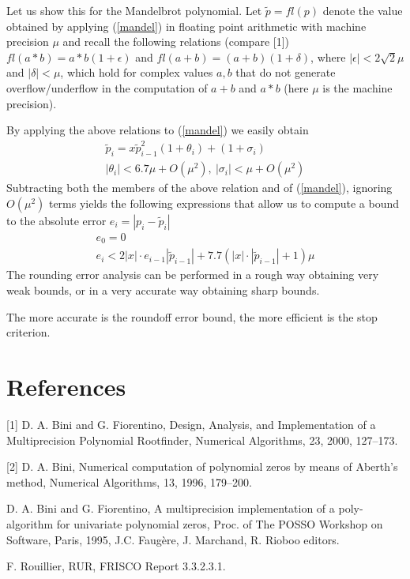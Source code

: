 \documentclass{article}
\begin{document}
Let us show this for the Mandelbrot polynomial.  Let $\widetilde
p=fl(p)$ denote the value obtained by applying (\ref{mandel}) in
floating point arithmetic with machine precision $\mu$ and recall the
following relations (compare [1]) $fl(a*b)=a*b(1+\epsilon)$ and
$fl(a+b)=(a+b)(1+\delta)$, where $|\epsilon|<2\sqrt 2\mu$ and
$|\delta|<\mu$, which hold for complex values $a,b$ that do not
generate overflow/underflow in the computation of $a+b$ and $a*b$
(here $\mu$ is the machine precision).

By applying the above relations to (\ref{mandel}) we easily obtain
\[
\begin{array}{l}
\widetilde p_{i}=x\widetilde p_{i-1}^2(1+\theta_i)+(1+\sigma_i) \\
|\theta_i|<6.7\mu +O(\mu^2),\ |\sigma_i|<\mu+O(\mu^2)
\end{array}
\]
Subtracting both the members of the above relation and of
(\ref{mandel}), ignoring $O(\mu^2)$ terms yields the following
expressions that allow us to compute a bound to the absolute error
$e_i=|p_i-\widetilde p_i|$
\[
\begin{array}{l}
e_0=0\\ e_{i}<2|x|\cdot e_{i-1}|\widetilde
p_{i-1}|+7.7(|x|\cdot|\widetilde p_{i-1}|+1)\mu
\end{array}
\]
The rounding error analysis can be performed in a rough way obtaining
very weak bounds, or in a very accurate way obtaining sharp bounds.
 
The more accurate is the roundoff error bound, the more efficient is
the stop criterion.

\section*{References}

[1] D. A. Bini and G. Fiorentino, Design, Analysis, and Implementation
of a Multiprecision Polynomial Rootfinder, Numerical Algorithms,
23, 2000, 127--173.

[2] D. A. Bini, Numerical computation of polynomial zeros by means of
Aberth's method, Numerical Algorithms, 13, 1996, 179--200.

\noindent
[3] D. A. Bini and G. Fiorentino, A multiprecision implementation of a
poly-algorithm for univariate polynomial zeros, Proc. of The POSSO
Workshop on Software, Paris, 1995, J.C. Faug\`ere, J. Marchand, R.
Rioboo editors.

\noindent
[4] F. Rouillier, RUR, FRISCO Report 3.3.2.3.1.
\end{document}
